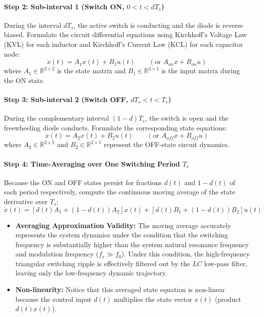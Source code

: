 \paragraph{Step 2: Sub-interval 1 (Switch ON, $0 < t < d T_s$)}
During the interval $d T_s$, the active switch is conducting and the diode is reverse biased. Formulate the circuit differential equations using Kirchhoff's Voltage Law (KVL) for each inductor and Kirchhoff's Current Law (KCL) for each capacitor node:
\begin{equation}
\dot{x}(t) = A_1 x(t) + B_1 u(t) \qquad (\text{or } A_{on} x + B_{on} u)
\end{equation}
where $A_1 \in \mathbb{R}^{2\times 2}$ is the state matrix and $B_1 \in \mathbb{R}^{2\times 1}$ is the input matrix during the ON state.

\paragraph{Step 3: Sub-interval 2 (Switch OFF, $d T_s < t < T_s$)}
During the complementary interval $(1-d)T_s$, the switch is open and the freewheeling diode conducts. Formulate the corresponding state equations:
\begin{equation}
\dot{x}(t) = A_2 x(t) + B_2 u(t) \qquad (\text{or } A_{off} x + B_{off} u)
\end{equation}
where $A_2 \in \mathbb{R}^{2\times 2}$ and $B_2 \in \mathbb{R}^{2\times 1}$ represent the OFF-state circuit dynamics.

\paragraph{Step 4: Time-Averaging over One Switching Period $T_s$}
Because the ON and OFF states persist for fractions $d(t)$ and $1-d(t)$ of each period respectively, compute the continuous moving average of the state derivative over $T_s$:
\begin{equation}
\dot{x}(t) = \left[ d(t) A_1 + (1 - d(t)) A_2 \right] x(t) + \left[ d(t) B_1 + (1 - d(t)) B_2 \right] u(t)
\end{equation}
\begin{itemize}
  \item \textbf{Averaging Approximation Validity:} The moving average accurately represents the system dynamics under the condition that the switching frequency is substantially higher than the system natural resonance frequency and modulation frequency ($f_s \gg f_0$). Under this condition, the high-frequency triangular switching ripple is effectively filtered out by the $LC$ low-pass filter, leaving only the low-frequency dynamic trajectory.
  \item \textbf{Non-linearity:} Notice that this averaged state equation is non-linear because the control input $d(t)$ multiplies the state vector $x(t)$ (product $d(t)x(t)$).
\end{itemize}

